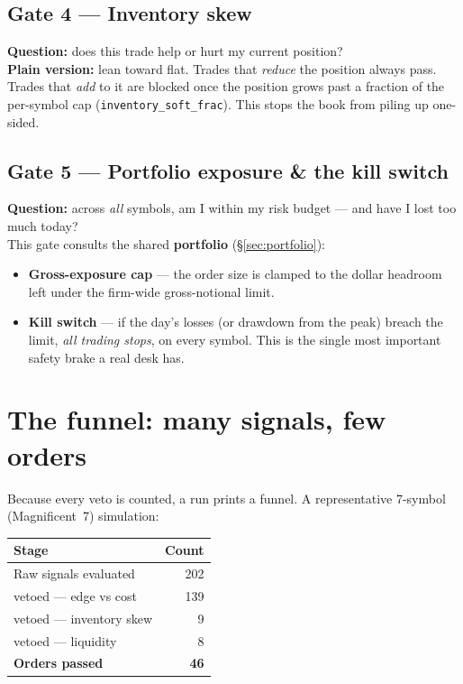 \documentclass[10pt,a4paper]{article}
\newcommand{\code}[1]{\texttt{\small #1}}
\begin{document}
\subsection{Gate 4 --- Inventory skew}
\textbf{Question:} does this trade help or hurt my current position? \\
\textbf{Plain version:} lean toward flat. Trades that \emph{reduce} the position
always pass. Trades that \emph{add} to it are blocked once the position grows past a
fraction of the per-symbol cap (\code{inventory\_soft\_frac}). This stops the book
from piling up one-sided.

\subsection{Gate 5 --- Portfolio exposure \& the kill switch}
\textbf{Question:} across \emph{all} symbols, am I within my risk budget --- and
have I lost too much today? \\
This gate consults the shared \textbf{portfolio} (\S\ref{sec:portfolio}):
\begin{itemize}[leftmargin=1.4em, itemsep=1pt]
  \item \textbf{Gross-exposure cap} --- the order size is clamped to the dollar
  headroom left under the firm-wide gross-notional limit.
  \item \textbf{Kill switch} --- if the day's losses (or drawdown from the peak)
  breach the limit, \emph{all trading stops}, on every symbol. This is the single
  most important safety brake a real desk has.
\end{itemize}

\section{The funnel: many signals, few orders}
\label{sec:funnel}

Because every veto is counted, a run prints a funnel. A representative 7-symbol
(Magnificent~7) simulation:

\begin{center}
\begin{tabular}{lr}
\toprule
\textbf{Stage} & \textbf{Count} \\
\midrule
Raw signals evaluated            & 202 \\
\quad vetoed --- edge vs cost    & 139 \\
\quad vetoed --- inventory skew  & 9 \\
\quad vetoed --- liquidity       & 8 \\
\textbf{Orders passed}           & \textbf{46} \\
\bottomrule
\end{tabular}
\end{center}
\end{document}

